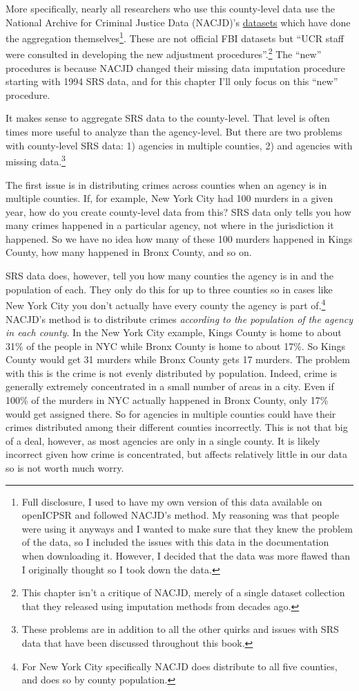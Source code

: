 \documentclass[
  12pt,
  openany]{book}
\begin{document}
More specifically, nearly all researchers who use this county-level data use the National Archive for Criminal Justice Data (NACJD)'s \href{https://www.icpsr.umich.edu/web/NACJD/series/57}{datasets} which have done the aggregation themselves\footnote{Full disclosure, I used to have my own version of this data available on openICPSR and followed NACJD's method. My reasoning was that people were using it anyways and I wanted to make sure that they knew the problem of the data, so I included the issues with this data in the documentation when downloading it. However, I decided that the data was more flawed than I originally thought so I took down the data.}. These are not official FBI datasets but ``UCR staff were consulted in developing the new adjustment procedures''.\footnote{This chapter isn't a critique of NACJD, merely of a single dataset collection that they released using imputation methods from decades ago.} The ``new'' procedures is because NACJD changed their missing data imputation procedure starting with 1994 SRS data, and for this chapter I'll only focus on this ``new'' procedure.

It makes sense to aggregate SRS data to the county-level. That level is often times more useful to analyze than the agency-level. But there are two problems with county-level SRS data: 1) agencies in multiple counties, 2) and agencies with missing data.\footnote{These problems are in addition to all the other quirks and issues with SRS data that have been discussed throughout this book.}

The first issue is in distributing crimes across counties when an agency is in multiple counties. If, for example, New York City had 100 murders in a given year, how do you create county-level data from this? SRS data only tells you how many crimes happened in a particular agency, not where in the jurisdiction it happened. So we have no idea how many of these 100 murders happened in Kings County, how many happened in Bronx County, and so on.

SRS data does, however, tell you how many counties the agency is in and the population of each. They only do this for up to three counties so in cases like New York City you don't actually have every county the agency is part of.\footnote{For New York City specifically NACJD does distribute to all five counties, and does so by county population.} NACJD's method is to distribute crimes \emph{according to the population of the agency in each county}. In the New York City example, Kings County is home to about 31\% of the people in NYC while Bronx County is home to about 17\%. So Kings County would get 31 murders while Bronx County gets 17 murders. The problem with this is the crime is not evenly distributed by population. Indeed, crime is generally extremely concentrated in a small number of areas in a city. Even if 100\% of the murders in NYC actually happened in Bronx County, only 17\% would get assigned there. So for agencies in multiple counties could have their crimes distributed among their different counties incorrectly. This is not that big of a deal, however, as most agencies are only in a single county. It is likely incorrect given how crime is concentrated, but affects relatively little in our data so is not worth much worry.
\end{document}
